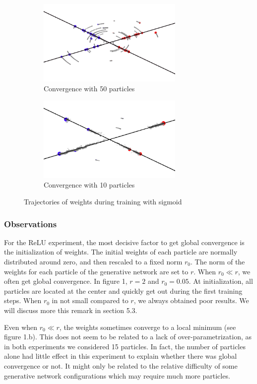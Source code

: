 \documentclass[a4paper, 11pt]{scrartcl}
\begin{document}
{\begin{figure}[h]
\centering
\begin{subfigure}{.5\textwidth}
  \centering
  \includegraphics[width=7cm]{sig50.png}
  \caption{Convergence with 50 particles}
  \label{fig:sub3}
\end{subfigure}%
\begin{subfigure}{.5\textwidth}
  \centering
  \includegraphics[width=7cm]{sig10.png}
  \caption{Convergence with 10 particles}
  \label{fig:sub4}
\end{subfigure}%
  \caption{Trajectories of weights during training with sigmoid}
\end{figure}


\subsubsection*{Observations}

For the ReLU experiment, the most decisive factor to get global convergence is the initialization of weights. The initial weights of each particle are normally distributed around zero, and then rescaled to a fixed norm $r_0$. The norm of the weights for each particle of the generative network are set to $r$. When $r_0 \ll r$, we often get global convergence. In figure 1, $r = 2$ and $r_0 = 0.05$. At initialization, all particles are located at the center and quickly get out during the first training steps. When $r_0$ in not small compared to $r$, we always obtained poor results. We will discuss more this remark in section 5.3.

Even when $r_0 \ll r$, the weights sometimes converge to a local minimum (see figure 1.b). This does not seem to be related to a lack of over-parametrization, as in both experiments we considered 15 particles. In fact, the number of particles alone had little effect in this experiment to explain whether there was global convergence or not. It might only be related to the relative difficulty of some generative network configurations which may require much more particles.\\

}
\end{document}
